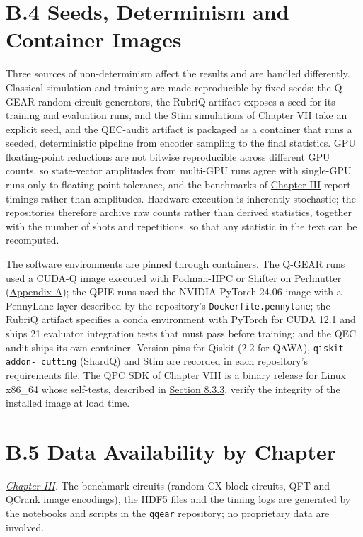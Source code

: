 \documentclass{report}
\theoremstyle{plain}
\theoremstyle{definition}
\theoremstyle{remark}
\begin{document}
\section{B.4 Seeds, Determinism and Container Images}\label{sec:apprepro:seeds}

Three sources of non-determinism affect the results and are handled differently. Classical simulation and training are made reproducible by fixed seeds: the Q-GEAR random-circuit generators, the RubriQ artifact exposes a seed for its training and evaluation runs, and the Stim simulations of \hyperref[ch:qec]{Chapter VII} take an explicit seed, and the QEC-audit artifact is packaged as a container that runs a seeded, deterministic pipeline from encoder sampling to the final statistics. GPU floating-point reductions are not bitwise reproducible across different GPU counts, so state-vector amplitudes from multi-GPU runs agree with single-GPU runs only to floating-point tolerance, and the benchmarks of \hyperref[ch:qgear]{Chapter III} report timings rather than amplitudes. Hardware execution is inherently stochastic; the repositories therefore archive raw counts rather than derived statistics, together with the number of shots and repetitions, so that any statistic in the text can be recomputed.

The software environments are pinned through containers. The Q-GEAR runs used a CUDA-Q image executed with Podman-HPC or Shifter on Perlmutter (\hyperref[app:qgear]{Appendix A}); the QPIE runs used the NVIDIA PyTorch 24.06 image with a PennyLane layer described by the repository's \texttt{Dockerfile.pennylane}; the RubriQ artifact specifies a conda environment with PyTorch for CUDA 12.1 and ships 21 evaluator integration tests that must pass before training; and the QEC audit ships its own container. Version pins for Qiskit (2.2 for QAWA), \texttt{qiskit-addon-  cutting} (ShardQ) and Stim are recorded in each repository's requirements file. The QPC SDK of \hyperref[ch:pqc]{Chapter VIII} is a binary release for Linux x86\_64 whose self-tests, described in \hyperref[sec:pqc:selftests]{Section 8.3.3}, verify the integrity of the installed image at load time.

\section{B.5 Data Availability by Chapter}\label{sec:apprepro:data}

\emph{\hyperref[ch:qgear]{Chapter III}.} The benchmark circuits (random CX-block circuits, QFT and QCrank image encodings), the HDF5 files and the timing logs are generated by the notebooks and scripts in the \texttt{qgear} repository; no proprietary data are involved.
\end{document}
